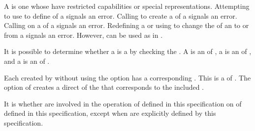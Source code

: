 A  is one whose  have restricted capabilities 
or special representations.  Attempting to use  to define 
 of a  signals an error.
Calling  to create a  of a 
 signals an error.  Calling  on a
 of a  signals an error.
Redefining a  or using  to change
the  of an  to or from a  signals an error.
However,  can be used as  
in .
                                        

It is possible to determine whether a  is a 
by checking the .
A   is an  of ,
a   is an  of , and
a  is an  of .
                                
Each   created by  without 
using the  option has a corresponding .  
This  is a  of .  
The  option of  creates a direct
 of the  
that corresponds to the included  
.

It is  whether  are involved in the
operation of  defined in this specification
on  of  defined in this specification,
except when  are explicitly defined by this specification.


